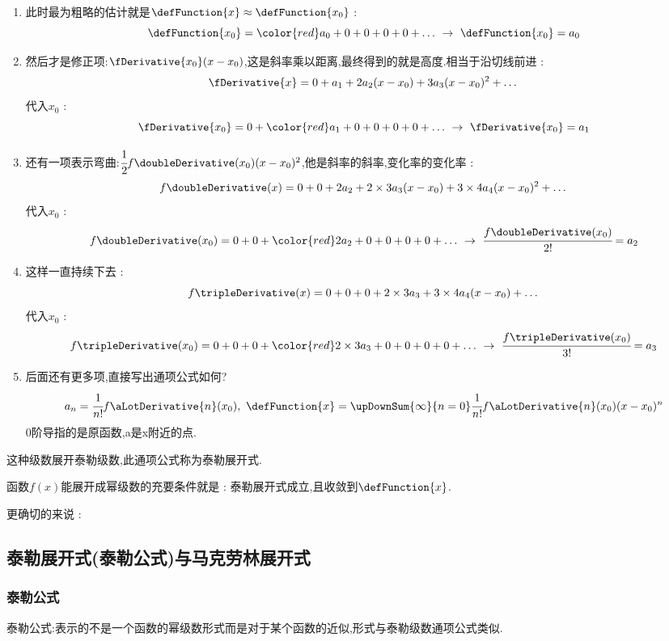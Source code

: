 {{{{  \begin{enumerate}
    \item 此时最为粗略的估计就是$\defFunction{x} \approx \defFunction{x_0}$ : $$
            \defFunction{x_0} = {\color{red}a_0} + 0 + 0 + 0 + 0 + \dots\ \to \ \defFunction{x_0} = a_0
          $$
    \item 然后才是修正项:$\fDerivative{x_0}(x - x_0)$,这是斜率乘以距离,最终得到的就是高度.相当于沿切线前进 : $$
            \fDerivative{x} = 0 + a_1 + 2a_2(x - x_0) + 3a_3(x - x_0)^2 + \dots
          $$代入$x_0$ : $$
            \fDerivative{x_0} = 0 + {\color{red}a_1} + 0 + 0 + 0 + 0 + \dots\ \to \ \fDerivative{x_0} = a_1
          $$
    \item 还有一项表示弯曲:$\cfrac{1}{2}f\doubleDerivative(x_0)(x - x_0)^2$,他是斜率的斜率,变化率的变化率 :
          $$
            f\doubleDerivative(x) = 0 + 0 + 2a_2 + 2 \times 3 a_3(x - x_0) + 3 \times 4 a_4(x - x_0)^2 + \dots \\
          $$代入$x_0$ : $$
            f\doubleDerivative(x_0) = 0 + 0 + {\color{red}2a_2} + 0 + 0 + 0 + 0 + \dots\ \to \ \cfrac{f\doubleDerivative(x_0)}{2!} = a_2
          $$
    \item 这样一直持续下去 : $$
            f\tripleDerivative(x) = 0 + 0 + 0 + 2 \times 3 a_3 + 3 \times 4 a_4(x - x_0) + \dots
          $$代入$x_0$ : $$
            f\tripleDerivative(x_0) = 0 + 0 + 0 + {\color{red}2 \times 3 a_3} + 0 + 0 + 0 + 0 + \dots\ \to \ \cfrac{f\tripleDerivative(x_0)}{3!} = a_3
          $$
    \item 后面还有更多项,直接写出通项公式如何?
          $$
            a_n = \cfrac{1}{n!}f\aLotDerivative{n}(x_0),\ \defFunction{x} = \upDownSum{\infty}{n = 0}\cfrac{1}{n!}f\aLotDerivative{n}(x_0)(x - x_0)^n
          $$
          0阶导指的是原函数,a是x附近的点.
  \end{enumerate}

}%

这种级数展开泰勒级数,此通项公式称为泰勒展开式.

函数$f(x)$能展开成幂级数的充要条件就是 : 泰勒展开式成立,且收敛到$\defFunction{x}$.

更确切的来说 :
\subsection{泰勒展开式(泰勒公式)与马克劳林展开式}{
\subsubsection{泰勒公式}{
  泰勒公式:表示的不是一个函数的幂级数形式而是对于某个函数的近似,形式与泰勒级数通项公式类似.

}}}}}
